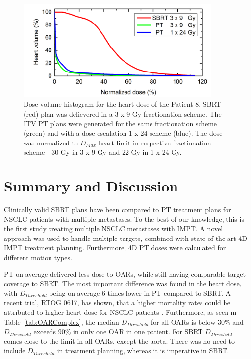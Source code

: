 \begin{figure}[H]
	\begin{center}
		\includegraphics[width=0.9\textwidth]{./ComplexPatients/Images/HeartDVH.png}
		\caption{Dose volume histogram for the heart dose of the Patient 8. SBRT (red) plan was delievered in a 3 x 9 Gy fractionation scheme. The ITV
		 PT plans were generated for the same fractionation scheme (green) and with a dose escalation 1 x 24 scheme (blue). The dose was normalized 
		 to $D_{Max}$ heart limit in respective fractionation scheme - 30 Gy in 3 x 9 Gy and 22 Gy in 1 x 24 Gy.}
		\label{Fig:heartDVH}
	\end{center}
\end{figure}
\newpage

\section{Summary and Discussion}

Clinically valid SBRT plans have been compared to PT treatment plans for NSCLC patients with multiple metastases. 
To the best of our knowledge, this is the first study treating multiple NSCLC metastases with IMPT. A novel approach was used to handle multiple targets, combined
with state of the art 4D IMPT treatment planning. Furthermore, 4D PT doses were calculated for different motion types. 

PT on average delivered less dose to OARs, while still having comparable target coverage to SBRT.
The most important difference was found in the heart dose, with $D_{Threshold}$ being on average 6 times lower in PT compared to SBRT. A recent trial, RTOG 0617, has shown,
that a higher mortality rates could be attributed to higher heart dose for NSCLC patients \cite{Bradley2015}. Furthermore, as seen in Table~\ref{tab:OARComplex}, the median
$D_{Threshold}$ for all OARs is below 30\% and $D_{Threshold}$ exceeds 90\% in only one OAR in one patient. For SBRT $D_{Threshold}$ comes close to the limit in all OARs,
except the aorta. There was no need to include $D_{Threshold}$ in treatment planning, whereas it is imperative in SBRT.

